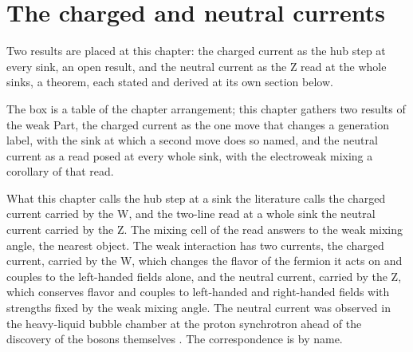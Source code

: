 \section{The charged and neutral currents}\label{mod:VI-4-charged-and-neutral-currents}
\begin{chtable}
Two results are placed at this chapter: the charged current as the hub step at every sink, an open result, and the neutral current as the Z read at the whole sinks, a theorem, each stated and derived at its own section below.
\end{chtable}
\chdeps{}{}
The box is a table of the chapter arrangement; this chapter gathers two results of the weak Part, the charged current as the one move that changes a generation label, with the sink at which a second move does so named, and the neutral current as a read posed at every whole sink, with the electroweak mixing a corollary of that read.
\begin{chbridge}
What this chapter calls the hub step at a sink the literature calls the charged current carried by the W, and the two-line read at a whole sink the neutral current carried by the Z. The mixing cell of the read answers to the weak mixing angle, the nearest object. The weak interaction has two currents, the charged current, carried by the W, which changes the flavor of the fermion it acts on and couples to the left-handed fields alone, and the neutral current, carried by the Z, which conserves flavor and couples to left-handed and right-handed fields with strengths fixed by the weak mixing angle. The neutral current was observed in the heavy-liquid bubble chamber at the proton synchrotron ahead of the discovery of the bosons themselves \cite{Weinberg1967,Hasert1973}. The correspondence is by name.
\end{chbridge}
